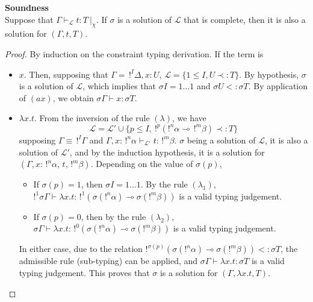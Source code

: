 \begin{prop}{\bf Soundness} \\
	Suppose that $\Gamma \vdash_\mathcal{L} t : T ~|_\chi$. If $\sigma$ is a solution
	of $\mathcal{L}$ that is complete, then it is also a solution for $(\Gamma, t, T)$.

	\begin{proof}
 		By induction on the constraint typing derivation. If the term is
 		\begin{itemize}
 		\item $x$. Then, supposing that $\Gamma = \,!^I\Delta, x : U$, $\mathcal{L} = \{ 1 \le I, U \prec: T \}$. By hypothesis, $\sigma$ is a solution
 			of $\mathcal{L}$, which implies that $\sigma I = 1 \dots 1$ and $\sigma U <: \sigma T$.
 			By application of $(ax)$, we obtain $\sigma \Gamma \vdash x : \sigma T$.
 			
 		\item $\lambda x.t$. From the inversion of the rule $(\lambda)$, we have
		 		$$\mathcal{L} = \mathcal{L'} \cup \{p \le I, ~!^p(!^n\alpha \multimap \,!^m\beta) \prec: T\}$$
		 	supposing $\Gamma \equiv \,!^I \Gamma$ and $\Gamma, x : \,!^n\alpha \vdash_\mathcal{L'} t : \,!^m\beta$.
		 	$\sigma$ being a solution of $\mathcal{L}$, it is also a solution of $\mathcal{L'}$, and
		 	by the induction hypothesis, it is a solution for $(\Gamma, x : \,!^n\alpha, \,t, \,!^m\beta)$. Depending on the value
		 	of $\sigma (p)$,
		 	\begin{itemize}
		 		\item If $\sigma(p) = 1$, then $\sigma I = 1 \dots 1$. By the rule $(\lambda_1)$,
		 			$!^1\sigma\Gamma \vdash \lambda x.t : \,!^1(\sigma(!^n \alpha) \multimap \sigma(!^m \beta))$ is a valid typing judgement.
		 			
		 		\item If $\sigma(p) = 0$, then by the rule $(\lambda_2)$,
		 			$\sigma\Gamma \vdash \lambda x.t : \,!^0(\sigma(!^n \alpha) \multimap \sigma(!^m \beta))$ is a valid typing judgement.
		 	\end{itemize}
			In either case, due to the relation $!^{\sigma(p)} (\sigma(!^n\alpha) \multimap \sigma(!^m\beta)) <: \sigma T$, the admissible rule
			(sub-typing) can be applied, and $\sigma \Gamma \vdash \lambda x . t : \sigma T$ is a valid typing judgement.
			This proves that $\sigma$ is a solution for $(\Gamma, \lambda x.t, T)$.
		

\end{itemize}
\end{proof}
\end{prop}
